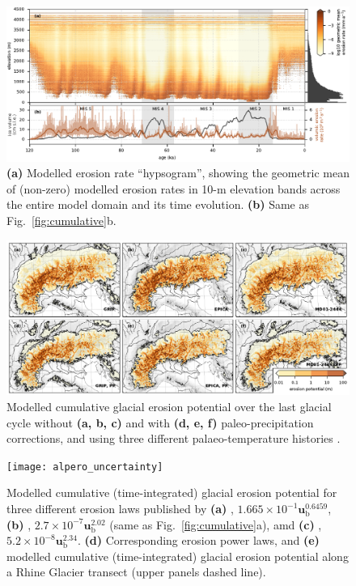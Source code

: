 \documentclass[utf8]{article}
\begin{document}
    \begin{figure}
      \centerline{\includegraphics{alpero_hypsogram}}
      \caption{%
        \textbf{(a)} Modelled erosion rate ``hypsogram'', showing the geometric
          mean of (non-zero) modelled erosion rates in 10-m elevation bands
          across the entire model domain and its time evolution.
        \textbf{(b)} Same as Fig.~\ref{fig:cumulative}b.}
      \label{fig:hypsogram}
    \end{figure}

    \begin{figure}
      \centerline{\includegraphics{alpero_sensitivity}}
      \caption{%
        Modelled cumulative glacial erosion potential over the last glacial
        cycle without \textbf{(a, b, c)} and with \textbf{(d, e, f)}
        paleo-precipitation corrections, and using three different
        palaeo-temperature histories \citep[see][]{Seguinot.etal.2018}.}
      \label{fig:sensitivity}
    \end{figure}

    \begin{figure}
      \centerline{\texttt{[image: alpero\_uncertainty]}}
      \caption{%
        Modelled cumulative (time-integrated) glacial erosion potential for
        three different erosion laws published by
        \textbf{(a)} \citet{Cook.etal.2020},
          $1.665 \times 10^{-1} \textbf{u}_\mathrm{b} ^{0.6459}$,
        \textbf{(b)} \citet{Herman.etal.2015},
          $2.7 \times 10^{-7} \textbf{u}_\mathrm{b} ^{2.02}$
          (same as Fig.~\ref{fig:cumulative}a), amd
        \textbf{(c)} \citet{Koppes.etal.2015},
          $5.2 \times 10^{-8} \textbf{u}_\mathrm{b} ^{2.34}$.
        \textbf{(d)} Corresponding erosion power laws, and
        \textbf{(e)} modelled cumulative (time-integrated) glacial erosion
          potential along a Rhine Glacier transect (upper panels dashed line).}
      \label{fig:uncertainty}
    \end{figure}



\end{document}
